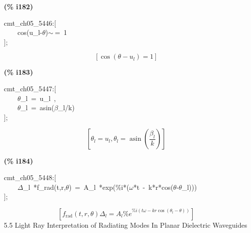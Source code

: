 \documentclass[fleqn]{article}
\begin{document}
\noindent
\begin{minipage}[t]{4.000000em}\color{red}\bfseries
(\% i182)	
\end{minipage}
\begin{minipage}[t]{\textwidth}\color{blue}
cmt\_ch05\_5446:[\\
\ \ \ \ cos(u\_l-\ensuremath{\theta})\ensuremath{\sim\ }=\ 1\\
];
\end{minipage}
\[\displaystyle \tag{\% o182} 
\left[ \cos{\left( \theta -{u_l}\right) }=1\right] \mbox{}
\]


\noindent
\begin{minipage}[t]{4.000000em}\color{red}\bfseries
(\% i183)	
\end{minipage}
\begin{minipage}[t]{\textwidth}\color{blue}
cmt\_ch05\_5447:[\\
\ \ \ \ \ensuremath{\theta}\_l\ =\ u\_l\ ,\\
\ \ \ \ \ensuremath{\theta}\_l\ =\ asin(\ensuremath{\beta}\_l/k)\\
];
\end{minipage}
\[\displaystyle \tag{\% o183} 
\left[ {{\theta }_l}={u_l}\operatorname{,}{{\theta }_l}=\operatorname{asin}\left( \frac{{{\beta }_l}}{k}\right) \right] \mbox{}
\]


\noindent
\begin{minipage}[t]{4.000000em}\color{red}\bfseries
(\% i184)	
\end{minipage}
\begin{minipage}[t]{\textwidth}\color{blue}
cmt\_ch05\_5448:[\\
\ \ \ \ \ensuremath{\Delta}\_l\ *f\_rad(t,r,\ensuremath{\theta})\ =\ A\_l\ *exp(\%i*(\ensuremath{\omega}*t\ -\ k*r*cos(\ensuremath{\theta}-\ensuremath{\theta}\_l)))\\
];
\end{minipage}
\[\displaystyle \tag{\% o184} 
\left[ {f_{\ensuremath{\mathrm{rad}}}}\left( t\operatorname{,}r\operatorname{,}\theta \right)  {{\Delta }_l}={A_l} {{\% e}^{\% i \left( t \omega -k r \cos{\left( {{\theta }_l}-\theta \right) }\right) }}\right] \mbox{}
\]
5.5     Light Ray Interpretation of Radiating Modes In Planar Dielectric  Waveguides
\end{document}
